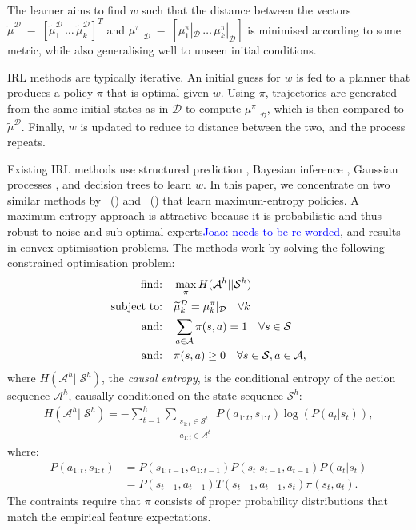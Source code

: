 \documentclass[letterpaper]{article}
\newcommand{\citet}[1]{\citeauthor{#1}~(\citeyear{#1})}
\newcommand{\jm}[1]{\textcolor{blue}{Joao: #1}}
\newcommand{\jm}[1]{}
\begin{document}
The learner aims to find $w$ such that the distance between the vectors $\widetilde\mu^{\mathcal{D}}~=~[\widetilde\mu^{\mathcal{D}}_1\,\ldots\,\widetilde\mu^{\mathcal{D}}_k]^T$ and $\mu^{\pi}|_{\mathcal{D}}~=~[\mu^{\pi}_1|_{\mathcal{D}}\,\ldots\,\mu^{\pi}_k|_{\mathcal{D}}]$ is minimised according to some metric, while also generalising well to unseen initial conditions.

IRL methods are typically iterative. An initial guess for $w$ is fed to a planner that produces a policy $\pi$ that is optimal given $w$.  Using $\pi$, trajectories are generated from the same initial states as in $\mathcal{D}$ to compute $\mu^{\pi}|_{\mathcal{D}}$, which is then compared to $\widetilde{\mu}^{\mathcal{D}}$.  Finally, $w$ is updated to reduce to distance between the two, and the process repeats.

Existing IRL methods use structured prediction \cite{ratliff2006maximum}, Bayesian inference \cite{ramachandran2007bayesian}, Gaussian processes \cite{levine2011nonlinear}, and decision trees \cite{ratliff2007boosting} to learn $w$.  In this paper, we concentrate on two similar methods by \citet{ziebart2008maximum} and \citet{ziebart2010modelingthesis} that learn maximum-entropy policies.  A maximum-entropy approach is attractive because it is probabilistic and thus robust to noise and sub-optimal experts\jm{needs to be re-worded}, and results in convex optimisation problems. The methods work by solving the following constrained optimisation problem:
\begin{align}
	\hbox{find:} &\quad\max\limits_{\pi} H(\mathcal{A}^h||\mathcal{S}^h)\label{eq:primal_obj}\\
\hbox{subject to:}&\quad\widetilde{\mu}^{\mathcal{D}}_k   = \mu^{\pi}_k|_{\mathcal{D}}\quad\forall k \label{eq:features_equality_constraint}\\
\hbox{and:} &\quad\sum_{a\in\mathcal{A}}\pi(s,a)  = 1\quad\forall s\in\mathcal{S}\\
\hbox{and:} &\quad\pi(s,a) \geq 0\quad\forall s\in\mathcal{S},a\in\mathcal{A},\label{eq:positive_policy}
\end{align}
where $H(\mathcal{A}^h||\mathcal{S}^h)$, the \emph{causal entropy}, is the conditional entropy of the action sequence $\mathcal{A}^h$, causally conditioned on the state sequence $\mathcal{S}^h$:
\begin{align}
H(\mathcal{A}^h||\mathcal{S}^h) = -\sum_{t=1}^h \sum_{\substack{s_{1:t}\in\mathcal{S}^t\\a_{1:t}\in\mathcal{A}^t}} P(a_{1:t},s_{1:t})\log(P(a_t|s_t)),
\label{eg:entdef}
\end{align}
where:
\begin{align*}
  P(a_{1:t},s_{1:t})&= P(s_{1:t-1},a_{1:t-1})P(s_t|s_{t-1},a_{t-1})P(a_t|s_t)\\
  &=P(s_{t-1},a_{t-1})T(s_{t-1},a_{t-1},s_t)\pi(s_t,a_t).
\end{align*}
The contraints require that $\pi$ consists of proper probability distributions that match the empirical feature expectations.
\end{document}
